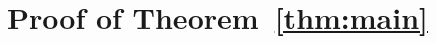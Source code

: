 \documentclass[12pt]{article}
\begin{document}

\section{Proof of Theorem~\ref{thm:main}}\label{sec:proof-main}
\end{document}
